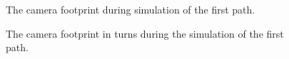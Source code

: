 \begin{figure}[!ht]
    \centering
    \caption{The camera footprint during simulation of the first path.}
	\label{fig:first_camera_path}
\end{figure}

\begin{figure}[!ht]
    \centering
    \caption{The camera footprint in turns during the simulation of the first path.}
	\label{fig:first_camera_turns}
\end{figure}

